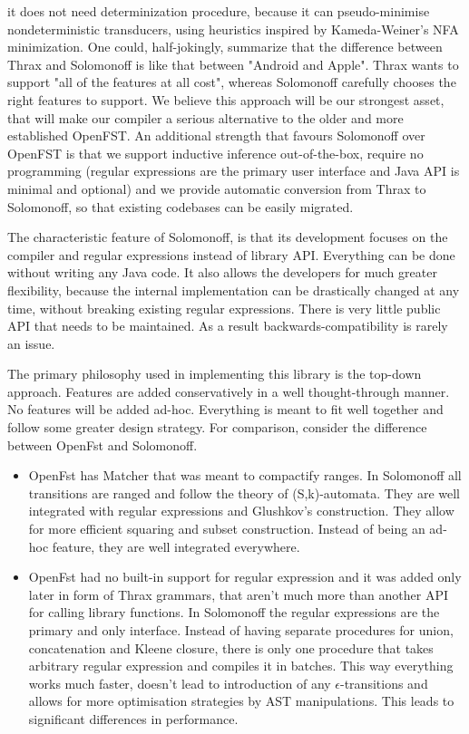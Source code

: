it does not need determinization procedure, because it can pseudo-minimise nondeterministic transducers, using heuristics inspired by Kameda-Weiner's NFA minimization. One could, half-jokingly, summarize that the difference between Thrax and Solomonoff is like that between "Android and Apple". Thrax wants to support "all of the features at all cost", whereas Solomonoff carefully chooses the right features to support. We believe this approach will be our strongest asset, that will make our compiler a serious alternative to the older and more established OpenFST. An additional strength that favours Solomonoff over OpenFST is that we support inductive inference out-of-the-box, require no programming (regular expressions are the primary user interface and Java API is minimal and optional) and we provide automatic conversion from Thrax to Solomonoff, so that existing codebases can be easily migrated.

The characteristic feature of Solomonoff, is that its development focuses on the compiler and regular expressions instead of library API. Everything can be done without writing any Java code. It also allows the developers for much greater flexibility, because the internal implementation can be drastically changed at any time, without breaking existing regular expressions. There is very little public API that needs to be maintained. As a result backwards-compatibility is rarely an issue.  

The primary philosophy used in implementing this library is the top-down approach. Features are added conservatively in a well thought-through manner. No features will be added ad-hoc. Everything is meant to fit well together and follow some greater design strategy. For comparison, consider the difference between OpenFst and Solomonoff.

\begin{itemize}
	\item OpenFst has Matcher that was meant to compactify ranges. In Solomonoff all transitions are ranged and follow the theory of (S,k)-automata. They are well integrated with regular expressions and Glushkov's construction. They allow for more efficient squaring and subset construction. Instead of being an ad-hoc feature, they are well integrated everywhere.
	
	\item OpenFst had no built-in support for regular expression and it was added only later in form of Thrax grammars, that aren't much more than another API for calling library functions. In Solomonoff the regular expressions are the primary and only interface. Instead of having separate procedures for union, concatenation and Kleene closure, there is only one procedure that takes arbitrary regular expression and compiles it in batches. This way everything works much faster, doesn't lead to introduction of any $\epsilon$-transitions and allows for more optimisation strategies by AST manipulations. This leads to significant differences in performance.
	
\end{itemize}


